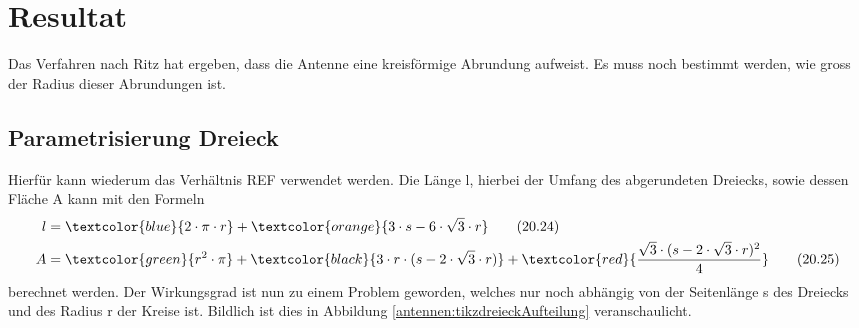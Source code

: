 %
%
% 
%
%

\section{Resultat\label{antennen:resultat}}

Das Verfahren nach Ritz hat ergeben, dass die Antenne eine kreisförmige Abrundung aufweist. 
Es muss noch bestimmt werden, wie gross der Radius dieser Abrundungen ist. 

\subsection{Parametrisierung Dreieck\label{antennen:param3eck}}
Hierfür kann wiederum das Verhältnis REF verwendet werden. Die Länge l, hierbei der Umfang 
des abgerundeten Dreiecks, sowie dessen Fläche A kann mit den Formeln
\begin{align}
	l &= \textcolor{blue}{2 \cdot \pi \cdot r} + \textcolor{orange}{3 \cdot s - 6 \cdot \sqrt{3} \cdot r} \tag{20.24} \label{antennen:Länge} \\
	A &= \textcolor{green}{r^2 \cdot \pi} + \textcolor{black}{3 \cdot r \cdot (s - 2 \cdot \sqrt{3} \cdot r)} + \textcolor{red}{\frac{\sqrt{3} \cdot (s - 2 \cdot \sqrt{3} \cdot r)^2}{4}} \tag{20.25} \label{antennen:Fläche}
\end{align}
\setcounter{equation}{25}
berechnet werden.
Der Wirkungsgrad ist nun zu einem Problem geworden, welches nur noch abhängig von 
der Seitenlänge s des Dreiecks und des Radius r der Kreise ist. Bildlich ist dies 
in Abbildung \ref{antennen:tikzdreieckAufteilung} veranschaulicht.


